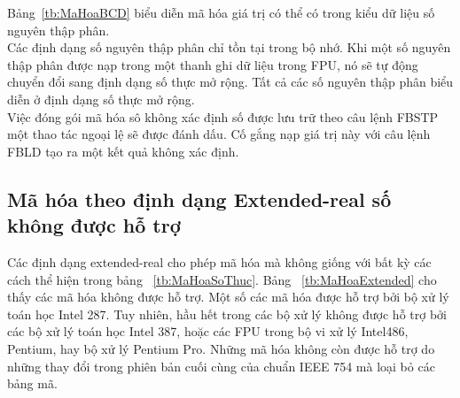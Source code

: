 		Bảng~\ref{tb:MaHoaBCD} biểu diễn mã hóa giá trị có thể có trong kiểu dữ liệu số nguyên thập phân.\\
	
		Các định dạng số nguyên thập phân chỉ tồn tại trong bộ nhớ. Khi một số nguyên thập phân được nạp trong một thanh ghi dữ liệu trong FPU, nó sẽ tự động chuyển đổi sang định dạng số thực mở rộng. Tất cả các số nguyên thập phân biểu diễn ở định dạng số thực mở rộng.\\
		
		Việc đóng gói mã hóa sô không xác định số được lưu trữ theo câu lệnh FBSTP một thao tác ngoại lệ sẽ được đánh dấu. Cố gắng nạp giá trị này với câu lệnh FBLD tạo ra một kết quả không xác định.

		\subsection*{Mã hóa theo định dạng Extended-real số không được hỗ trợ}
		Các định dạng extended-real cho phép mã hóa mà không giống với bất kỳ các cách thể hiện trong bảng ~\ref{tb:MaHoaSoThuc}. Bảng ~\ref{tb:MaHoaExtended} cho thấy các mã hóa không được hỗ trợ. Một số các mã hóa được hỗ trợ bởi bộ xử lý toán học Intel 287. Tuy nhiên, hầu hết trong các bộ xử lý không được hỗ trợ bởi các bộ xử lý toán học Intel 387, hoặc các FPU trong bộ vi xử lý Intel486, Pentium, hay bộ xử lý Pentium Pro. Những mã hóa không còn được hỗ trợ do những thay đổi trong phiên bản cuối cùng của chuẩn IEEE 754 mà loại bỏ các bảng mã.\\
	
